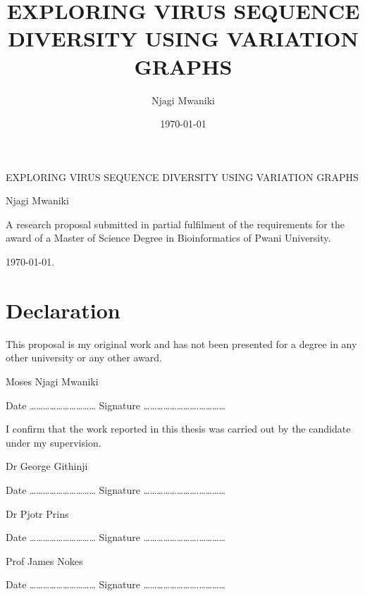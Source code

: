 \documentclass[11pt]{article}
\author{Njagi Mwaniki}
\date{\today}
\title{EXPLORING VIRUS SEQUENCE DIVERSITY USING VARIATION GRAPHS}
\begin{document}
\begin{titlepage}
\centering
{\LARGE EXPLORING VIRUS SEQUENCE DIVERSITY USING VARIATION GRAPHS \par }
\vspace {8cm}
{\small Njagi Mwaniki \par}
\vspace {8cm} 
{\small A research proposal submitted in partial fulfilment of the             requirements for the award of a Master of Science Degree in             Bioinformatics of Pwani University. \par}
\vspace {1mm} 
{\small \today. \par}
\end{titlepage}
\newcommand{\bigO}{\mathcal{O}}

\newpage
\section{Declaration}
\label{sec:org067fdf2}
This proposal is my original work and has not been presented for a degree in 
any other university or any other award.

\vspace{10mm}

Moses Njagi Mwaniki

Date …………………………    Signature …………………….…………

\vspace{20mm}
I confirm that the work reported in this thesis was carried out by the candidate under my supervision.

\vspace{10mm}

Dr George Githinji

Date …………………………    Signature …………………….…………

\vspace{10mm}

Dr Pjotr Prins

Date …………………………    Signature …………………….…………

\vspace{10mm}

Prof James Nokes

Date …………………………    Signature …………………….…………
\end{document}
